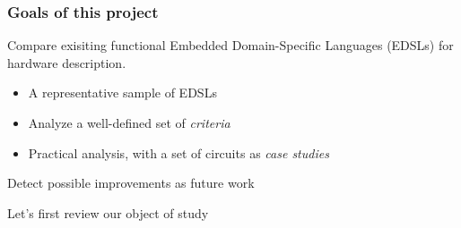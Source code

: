         \begin{frame}
            \frametitle{Goals of this project}

            \par{Compare exisiting functional Embedded Domain-Specific Languages (EDSLs) for hardware description.}
            \vspace{0.2cm}
            \begin{itemize}
                \item A representative sample of EDSLs
                \item Analyze a well-defined set of \emph{criteria}
                \item Practical analysis, with a set of circuits as \emph{case studies}
            \end{itemize}

            \vspace{0.2cm}
            \par{Detect possible improvements as future work}

            \pause
            \vspace{0.4cm}
            \par{Let's first review our object of study}

        \end{frame}


